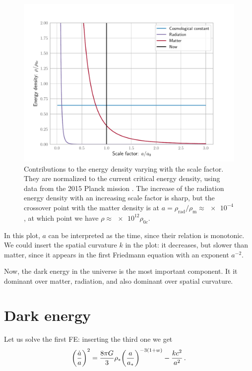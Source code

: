 \documentclass[main.tex]{subfiles}
\begin{document}
\begin{figure}[ht]
\centering
\includegraphics[width=\textwidth]{figures/global_energy_contributions.pdf}
\caption{Contributions to the energy density varying with the scale factor. They are normalized to the current critical energy density, using data from the 2015 Planck mission \cite{PlanckCollaboration:2016XIII}. The increase of the radiation energy density with an increasing scale factor is sharp, but the crossover point with the matter density is at \(a = \rho_{\text{rad}}/\rho_{\text{m}} \approx \num{e-4}\), at which point we have \(\rho \approx \num{e12} \rho_{0c}\).}
\label{fig:global_energy_contributions}
\end{figure}

In this plot, \(a\) can be interpreted as the time, since their relation is monotonic.
We could insert the spatial curvature \(k\) in the plot: it decreases, but slower than matter, since it appears in the first Friedmann equation with an exponent \(a^{-2}\). 


Now, the dark energy in the universe is the most important component. It it dominant over matter, radiation, and also dominant over spatial curvature.

\section{Dark energy}

Let us solve the first FE: inserting the third one we get
\begin{equation}
  \qty(\frac{\dot{a} }{a})^2 = 
  \frac{8 \pi G}{3} \rho_* \qty(\frac{a}{a_*}) ^{-3 (1+w)} - \frac{kc^2}{a^2}\,.
\end{equation}
\end{document}
